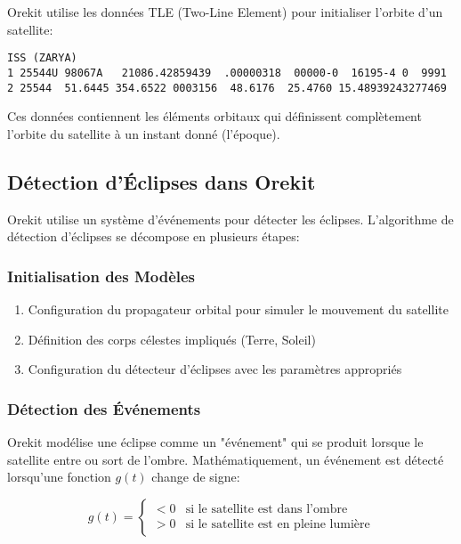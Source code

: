 \documentclass[12pt,a4paper]{article}
\begin{document}
Orekit utilise les données TLE (Two-Line Element) pour initialiser l'orbite d'un satellite:

\begin{verbatim}
ISS (ZARYA)
1 25544U 98067A   21086.42859439  .00000318  00000-0  16195-4 0  9991
2 25544  51.6445 354.6522 0003156  48.6176  25.4760 15.48939243277469
\end{verbatim}

Ces données contiennent les éléments orbitaux qui définissent complètement l'orbite du satellite à un instant donné (l'époque).

\subsection{Détection d'Éclipses dans Orekit}

Orekit utilise un système d'événements pour détecter les éclipses. L'algorithme de détection d'éclipses se décompose en plusieurs étapes:

\subsubsection{Initialisation des Modèles}

\begin{enumerate}
    \item Configuration du propagateur orbital pour simuler le mouvement du satellite
    \item Définition des corps célestes impliqués (Terre, Soleil)
    \item Configuration du détecteur d'éclipses avec les paramètres appropriés
\end{enumerate}

\subsubsection{Détection des Événements}

Orekit modélise une éclipse comme un "événement" qui se produit lorsque le satellite entre ou sort de l'ombre. Mathématiquement, un événement est détecté lorsqu'une fonction $g(t)$ change de signe:

\begin{equation}
g(t) = 
\begin{cases}
< 0 & \text{si le satellite est dans l'ombre} \\
> 0 & \text{si le satellite est en pleine lumière}
\end{cases}
\end{equation}
\end{document}
